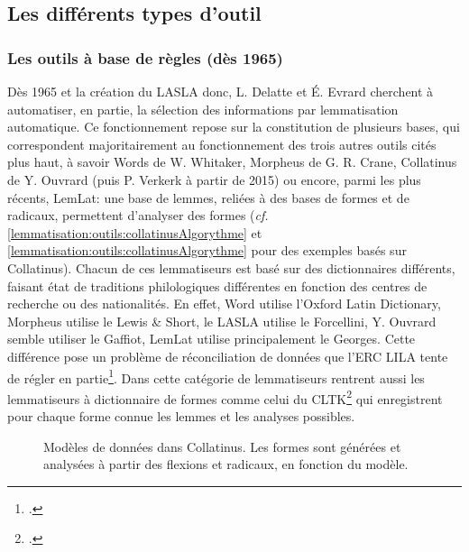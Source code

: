 \subsection{Les différents types d'outil}

\subsubsection{Les outils à base de règles (dès 1965)}

Dès 1965 et la création du LASLA donc, L. Delatte et É. Evrard cherchent à automatiser, en partie, la sélection des informations par lemmatisation automatique. Ce fonctionnement repose sur la constitution de plusieurs bases, qui correspondent majoritairement au fonctionnement des trois autres outils cités plus haut, à savoir Words de W. Whitaker, Morpheus de G. R. Crane, Collatinus de Y. Ouvrard (puis P. Verkerk à partir de 2015) ou encore, parmi les plus récents, LemLat: une base de lemmes, reliées à des bases de formes et de radicaux, permettent d'analyser des formes (\textit{cf.} \ref{lemmatisation:outils:collatinusAlgorythme} et \ref{lemmatisation:outils:collatinusAlgorythme} pour des exemples basés sur Collatinus). Chacun de ces lemmatiseurs est basé sur des dictionnaires différents, faisant état de traditions philologiques différentes en fonction des centres de recherche ou des nationalités. En effet, Word utilise l'Oxford Latin Dictionary, Morpheus utilise le Lewis \& Short, le LASLA utilise le Forcellini, Y. Ouvrard semble utiliser le Gaffiot, LemLat utilise principalement le Georges. Cette différence pose un problème de réconciliation de données que l'ERC LILA tente de régler en partie\footcite{mambrini_harmonizing_2019}. Dans cette catégorie de lemmatiseurs rentrent aussi les lemmatiseurs à dictionnaire de formes comme celui du CLTK\footcite{johnson2014cltk} qui enregistrent pour chaque forme connue les lemmes et les analyses possibles.

\begin{figure}[h]
    \centering
    \caption{Modèles de données dans Collatinus. Les formes sont générées et analysées à partir des flexions et radicaux, en fonction du modèle. }
    \label{lemmatisation:outils:collatinusDB}
\end{figure}


